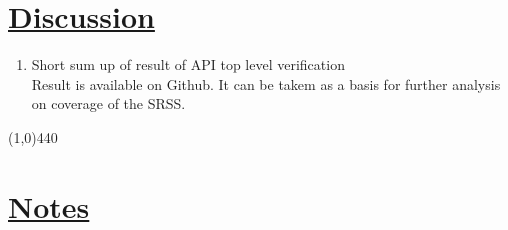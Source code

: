 \documentclass[a4paper]{article}
\begin{document}
\section*{\underline{Discussion}}
\begin{enumerate}
\item Short sum up of result of API top level verification\\
Result is available on Github. It can be takem as a basis for further analysis on coverage of the SRSS.


\end{enumerate}

\line(1,0){440}
\section*{\underline{Notes}}
\end{document}
